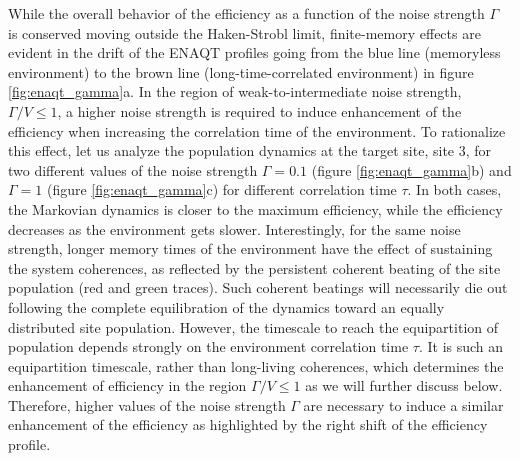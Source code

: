 \documentclass[12pt, amsmath, amssymb, graphicx]{iopart}
\begin{document}
While the overall behavior of the efficiency as a function of the noise strength $\Gamma$ is conserved moving outside the Haken-Strobl limit, finite-memory effects are evident in the drift of the ENAQT profiles going from the blue line (memoryless environment) to the brown line (long-time-correlated environment) in figure \ref{fig:enaqt_gamma}a.
In the region of weak-to-intermediate noise strength, $\Gamma/V \le 1$, a higher noise strength is required to induce enhancement of the efficiency when increasing the correlation time of the environment.
To rationalize this effect, let us analyze the population dynamics at the target site, site 3, for two different values of the noise strength $\Gamma = 0.1$ (figure \ref{fig:enaqt_gamma}b) and $\Gamma = 1$ (figure \ref{fig:enaqt_gamma}c) for different correlation time $\tau$.
In both cases, the Markovian dynamics is closer to the maximum efficiency, while the efficiency decreases as the environment gets slower.
Interestingly, for the same noise strength, longer memory times of the environment have the effect of sustaining the system coherences, as reflected by the persistent coherent beating of the site population (red and green traces).
Such coherent beatings will necessarily die out following the complete equilibration of the dynamics toward an equally distributed site population.
However, the timescale to reach the equipartition of population depends strongly on the environment correlation time $\tau$.
It is such an equipartition timescale, rather than long-living coherences, which determines the enhancement of efficiency in the region $\Gamma/V \le 1$ as we will further discuss below.
Therefore, higher values of the noise strength $\Gamma$ are necessary to induce a similar enhancement of the efficiency as highlighted by the right shift of the efficiency profile.
\end{document}
